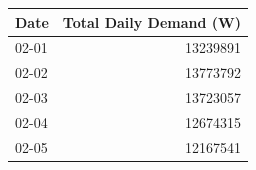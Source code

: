 \begin{tabular}{lr}
\toprule
Date & Total Daily Demand (W) \\
\midrule
02-01 & 13239891 \\
02-02 & 13773792 \\
02-03 & 13723057 \\
02-04 & 12674315 \\
02-05 & 12167541 \\
\bottomrule
\end{tabular}
